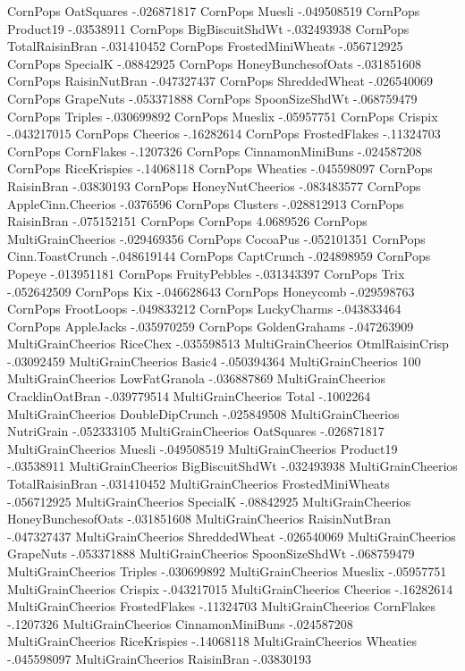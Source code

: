 CornPops	OatSquares	-.026871817
CornPops	Muesli	-.049508519
CornPops	Product19	-.03538911
CornPops	BigBiscuitShdWt	-.032493938
CornPops	TotalRaisinBran	-.031410452
CornPops	FrostedMiniWheats	-.056712925
CornPops	SpecialK	-.08842925
CornPops	HoneyBunchesofOats	-.031851608
CornPops	RaisinNutBran	-.047327437
CornPops	ShreddedWheat	-.026540069
CornPops	GrapeNuts	-.053371888
CornPops	SpoonSizeShdWt	-.068759479
CornPops	Triples	-.030699892
CornPops	Mueslix	-.05957751
CornPops	Crispix	-.043217015
CornPops	Cheerios	-.16282614
CornPops	FrostedFlakes	-.11324703
CornPops	CornFlakes	-.1207326
CornPops	CinnamonMiniBuns	-.024587208
CornPops	RiceKrispies	-.14068118
CornPops	Wheaties	-.045598097
CornPops	RaisinBran	-.03830193
CornPops	HoneyNutCheerios	-.083483577
CornPops	AppleCinn.Cheerios	-.0376596
CornPops	Clusters	-.028812913
CornPops	RaisinBran	-.075152151
CornPops	CornPops	4.0689526
CornPops	MultiGrainCheerios	-.029469356
CornPops	CocoaPus	-.052101351
CornPops	Cinn.ToastCrunch	-.048619144
CornPops	CaptCrunch	-.024898959
CornPops	Popeye	-.013951181
CornPops	FruityPebbles	-.031343397
CornPops	Trix	-.052642509
CornPops	Kix	-.046628643
CornPops	Honeycomb	-.029598763
CornPops	FrootLoops	-.049833212
CornPops	LuckyCharms	-.043833464
CornPops	AppleJacks	-.035970259
CornPops	GoldenGrahams	-.047263909
MultiGrainCheerios	RiceChex	-.035598513
MultiGrainCheerios	OtmlRaisinCrisp	-.03092459
MultiGrainCheerios	Basic4	-.050394364
MultiGrainCheerios	100%
MultiGrainCheerios	LowFatGranola	-.036887869
MultiGrainCheerios	CracklinOatBran	-.039779514
MultiGrainCheerios	Total	-.1002264
MultiGrainCheerios	DoubleDipCrunch	-.025849508
MultiGrainCheerios	NutriGrain	-.052333105
MultiGrainCheerios	OatSquares	-.026871817
MultiGrainCheerios	Muesli	-.049508519
MultiGrainCheerios	Product19	-.03538911
MultiGrainCheerios	BigBiscuitShdWt	-.032493938
MultiGrainCheerios	TotalRaisinBran	-.031410452
MultiGrainCheerios	FrostedMiniWheats	-.056712925
MultiGrainCheerios	SpecialK	-.08842925
MultiGrainCheerios	HoneyBunchesofOats	-.031851608
MultiGrainCheerios	RaisinNutBran	-.047327437
MultiGrainCheerios	ShreddedWheat	-.026540069
MultiGrainCheerios	GrapeNuts	-.053371888
MultiGrainCheerios	SpoonSizeShdWt	-.068759479
MultiGrainCheerios	Triples	-.030699892
MultiGrainCheerios	Mueslix	-.05957751
MultiGrainCheerios	Crispix	-.043217015
MultiGrainCheerios	Cheerios	-.16282614
MultiGrainCheerios	FrostedFlakes	-.11324703
MultiGrainCheerios	CornFlakes	-.1207326
MultiGrainCheerios	CinnamonMiniBuns	-.024587208
MultiGrainCheerios	RiceKrispies	-.14068118
MultiGrainCheerios	Wheaties	-.045598097
MultiGrainCheerios	RaisinBran	-.03830193

